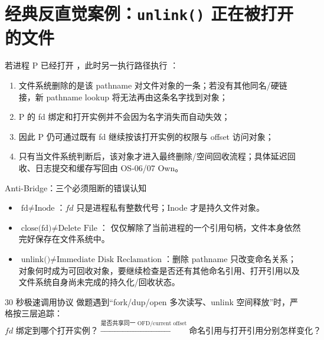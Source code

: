 \documentclass[UTF8,fontset=none,11pt,a4paper]{ctexart}
\begin{document}
\section{经典反直觉案例：\texttt{unlink()} 正在被打开的文件}

若进程 P 已经打开 ，此时另一执行路径执行 ：
\begin{enumerate}
  \item 文件系统删除的是该 pathname 对文件对象的一条；若没有其他同名/硬链接，新 pathname lookup 将无法再由这条名字找到对象；
  \item P 的 fd 绑定和打开实例并不会因为名字消失而自动失效；
  \item 因此 P 仍可通过既有 fd 继续按该打开实例的权限与 offset 访问对象；
  \item 只有当文件系统判断后，该对象才进入最终删除/空间回收流程；具体延迟回收、日志提交和缓存写回由 OS-06/07 Own。
\end{enumerate}

\begin{warnbox}{Anti-Bridge：三个必须阻断的错误认知}
\begin{itemize}
  \item \(\text{fd} \neq \text{Inode}\)：$fd$ 只是进程私有整数代号；Inode 才是持久文件对象。
  \item \(\text{close(fd)} \neq \text{Delete File}\)： 仅仅解除了当前进程的一个引用句柄，文件本身依然完好保存在文件系统中。
  \item \(\text{unlink()} \neq \text{Immediate Disk Reclamation}\)：删除 pathname 只改变命名关系；对象何时成为可回收对象，要继续检查是否还有其他命名引用、打开引用以及文件系统自身尚未完成的持久化/回收状态。
\end{itemize}
\end{warnbox}

\begin{corebox}{30 秒极速调用协议}
做题遇到“fork/dup/open 多次读写、unlink 空间释放”时，严格按三层追踪：
\[
\boxed{fd \text{ 绑定到哪个打开实例？}} \xrightarrow{\text{是否共享同一 OFD/current offset}} \boxed{\text{命名引用与打开引用分别怎样变化？}}
\]
\end{corebox}
\end{document}
